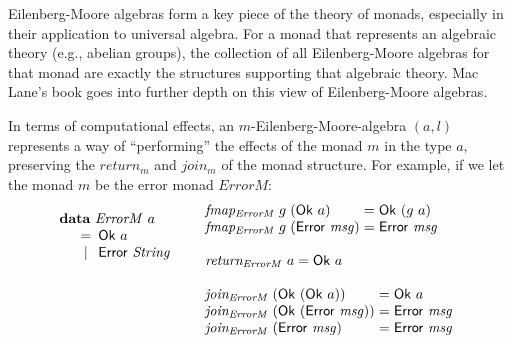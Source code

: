\documentclass{jfp1}
\newcommand{\kw}[1]{\textbf{#1}}
\begin{document}
Eilenberg-Moore algebras form a key piece of the theory of monads,
especially in their application to universal algebra. For a monad that
represents an algebraic theory (e.g., abelian groups), the collection
of all Eilenberg-Moore algebras for that monad are exactly the
structures supporting that algebraic theory. Mac Lane's book
\cite{maclane98} goes into further depth on this view of
Eilenberg-Moore algebras.

In terms of computational effects, an $m$-Eilenberg-Moore-algebra $(a,
l)$ represents a way of ``performing'' the effects of the monad $m$ in
the type $a$, preserving the $\mathit{return}_m$ and $\mathit{join_m}$
of the monad structure. For example, if we let the monad $m$ be the
error monad $\mathit{ErrorM}$:
\begin{displaymath}
  \begin{array}{ll}
    \begin{array}[t]{l}
      \kw{data}~\mathit{ErrorM}~a \\
      \quad
      \begin{array}{c@{\hspace{0.5em}}l}
        = & \mathsf{Ok}~a \\
        | & \mathsf{Error}~\mathit{String}
      \end{array}
    \end{array}
    &
    \begin{array}[t]{l}
      \begin{array}{@{}l@{\hspace{0.3em}}l@{\hspace{0.3em}}l@{\hspace{0.3em}}c@{\hspace{0.3em}}l}
        \mathit{fmap_{ErrorM}}&g&(\mathsf{Ok}~a) &=& \mathsf{Ok}~(g~a) \\
        \mathit{fmap_{ErrorM}}&g&(\mathsf{Error}~\mathit{msg}) &=& \mathsf{Error}~\mathit{msg} \\
      \end{array} \\
      \\
      \mathit{return_{ErrorM}}~a = \mathsf{Ok}~a \\
      \\
      \begin{array}{@{}l@{\hspace{0.3em}}l@{\hspace{0.3em}}c@{\hspace{0.3em}}l}
        \mathit{join_{ErrorM}}&(\mathsf{Ok}~(\mathsf{Ok}~a)) &=& \mathsf{Ok}~a \\
        \mathit{join_{ErrorM}}&(\mathsf{Ok}~(\mathsf{Error}~\mathit{msg})) &=& \mathsf{Error}~\mathit{msg} \\
        \mathit{join_{ErrorM}}&(\mathsf{Error}~\mathit{msg}) &=& \mathsf{Error}~\mathit{msg}
      \end{array}
    \end{array}
  \end{array}
\end{displaymath}
\end{document}
